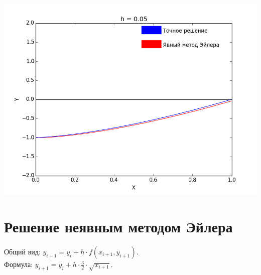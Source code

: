 \documentclass[12pt,a4paper]{article}
\begin{document}
        \includegraphics[scale=0.45]{explicitEulerGraph_Step=0_05}
        
    \section*{Решение неявным методом Эйлера}
    	Общий вид: $y_{i+1} = y_{i} + h \cdot f(x_{i+1}, y_{i+1})$.\\
        Формула: $y_{i+1} = y_{i} + h \cdot \frac{3}{2} \cdot \sqrt{x_{i+1}}$.\\
        
\end{document}
